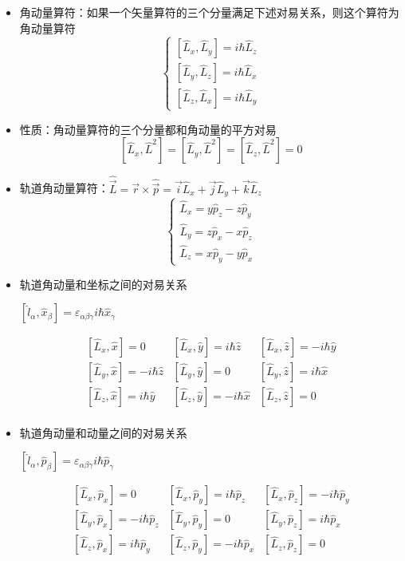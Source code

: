 \documentclass[UTF8,twocolumn]{ctexart}
\begin{document}
\begin{itemize}
\item
  角动量算符：如果一个矢量算符的三个分量满足下述对易关系，则这个算符为角动量算符
  \[\begin{cases} 
    [\hat{L}_x,\hat{L}_y]=i\hbar\hat{L}_z\\
    [\hat{L}_y,\hat{L}_z]=i\hbar\hat{L}_x\\
    [\hat{L}_z,\hat{L}_x]=i\hbar\hat{L}_y
  \end{cases}\]
\item
  性质：角动量算符的三个分量都和角动量的平方对易 \[
    [\hat{L}_x,\hat{L}^2]=[\hat{L}_y,\hat{L}^2]=[\hat{L}_z,\hat{L}^2]=0
  \]
\item
  轨道角动量算符：\(\hat{\vec{L}}=\vec{r}\times\hat{\vec{p}}=\vec{i}\hat{L}_x+\vec{j}\hat{L}_y+\vec{k}\hat{L}_z\)
  \[\begin{cases} 
    \hat{L}_x=y\hat{p}_z-z\hat{p}_y\\
    \hat{L}_y=z\hat{p}_x-x\hat{p}_z\\
    \hat{L}_z=x\hat{p}_y-y\hat{p}_x
  \end{cases}\]
\item
  轨道角动量和坐标之间的对易关系
  \begin{center}
  $[\hat{l}_{\alpha},\hat{x}_{\beta}]=\varepsilon_{\alpha\beta\gamma}i\hbar\hat{x}_{\gamma}$
  \end{center}
\begin{equation*}
  \begin{array}{lll}
    {[\hat{L}_x,\hat{x}]}=0 & [\hat{L}_x,\hat{y}]=i\hbar\hat{z} & [\hat{L}_x,\hat{z}]=-i\hbar\hat{y} \\
    {[\hat{L}_y,\hat{x}]}=-i\hbar\hat{z} & [\hat{L}_y,\hat{y}]=0 & [\hat{L}_y,\hat{z}]=i\hbar\hat{x} \\
    {[\hat{L}_z,\hat{x}]}=i\hbar\hat{y} & [\hat{L}_z,\hat{y}]=-i\hbar\hat{x} & [\hat{L}_z,\hat{z}]=0 \\
  \end{array}
\end{equation*}
\item
  轨道角动量和动量之间的对易关系
  \begin{center}
  $[\hat{l}_{\alpha},\hat{p}_{\beta}]=\varepsilon_{\alpha\beta\gamma}i\hbar\hat{p}_{\gamma}$
  \end{center}
  \begin{equation*}
  \begin{array}{lll}
    {[\hat{L}_x,\hat{p}_x]}=0 & [\hat{L}_x,\hat{p}_y]=i\hbar\hat{p}_z & [\hat{L}_x,\hat{p}_z]=-i\hbar\hat{p}_y\\
    {[\hat{L}_y,\hat{p}_x]}=-i\hbar\hat{p}_z & [\hat{L}_y,\hat{p}_y]=0 & [\hat{L}_y,\hat{p}_z]=i\hbar\hat{p}_x\\
    {[\hat{L}_z,\hat{p}_x]}=i\hbar\hat{p}_y & [\hat{L}_z,\hat{p}_y]=-i\hbar\hat{p}_x & [\hat{L}_z,\hat{p}_z]=0
  \end{array}
  \end{equation*}
\end{itemize}
\end{document}

